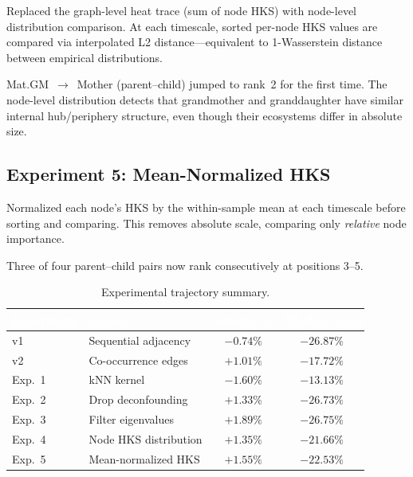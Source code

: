 \documentclass{../yalumba}
\begin{document}
Replaced the graph-level heat trace (sum of node HKS) with node-level
distribution comparison.  At each timescale, sorted per-node HKS values are
compared via interpolated L2 distance---equivalent to 1-Wasserstein distance
between empirical distributions.

\begin{keyfinding}
Mat.GM~$\to$~Mother (parent--child) jumped to rank~2 for the first time.
The node-level distribution detects that grandmother and granddaughter have
similar internal hub/periphery structure, even though their ecosystems differ
in absolute size.
\end{keyfinding}

\subsection{Experiment 5: Mean-Normalized HKS}

Normalized each node's HKS by the within-sample mean at each timescale before
sorting and comparing.  This removes absolute scale, comparing only
\emph{relative} node importance.

Three of four parent--child pairs now rank consecutively at positions 3--5.

\begin{table}[H]
  \centering
  \tablestyle
  \caption{Experimental trajectory summary.}
  \label{tab:trajectory}
  \begin{tabular}{llcc}
    \toprule
    \rowcolor{table-header}
    \textcolor{white}{\textbf{Experiment}} &
    \textcolor{white}{\textbf{Change}} &
    \textcolor{white}{\textbf{Separation}} &
    \textcolor{white}{\textbf{Weakest Gap}} \\
    \midrule
    v1 & Sequential adjacency & $-0.74\%$ & $-26.87\%$ \\
    v2 & Co-occurrence edges & $+1.01\%$ & $-17.72\%$ \\
    Exp.\ 1 & kNN kernel & $-1.60\%$ & $-13.13\%$ \\
    Exp.\ 2 & Drop deconfounding & $+1.33\%$ & $-26.73\%$ \\
    Exp.\ 3 & Filter eigenvalues & $\mathbf{+1.89\%}$ & $-26.75\%$ \\
    Exp.\ 4 & Node HKS distribution & $+1.35\%$ & $-21.66\%$ \\
    Exp.\ 5 & Mean-normalized HKS & $+1.55\%$ & $-22.53\%$ \\
    \bottomrule
  \end{tabular}
\end{table}
\end{document}
